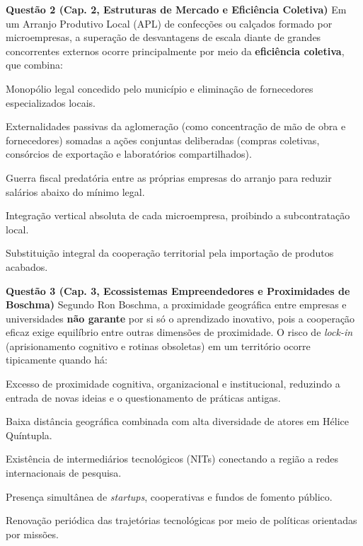 \textbf{Questão 2 (Cap. 2, Estruturas de Mercado e Eficiência Coletiva)}
Em um Arranjo Produtivo Local (APL) de confecções ou calçados formado por microempresas, a superação de desvantagens de escala diante de grandes concorrentes externos ocorre principalmente por meio da \textbf{eficiência coletiva}, que combina:
\begin{alternativas}
  \item Monopólio legal concedido pelo município e eliminação de fornecedores especializados locais.
  \item Externalidades passivas da aglomeração (como concentração de mão de obra e fornecedores) somadas a ações conjuntas deliberadas (compras coletivas, consórcios de exportação e laboratórios compartilhados).
  \item Guerra fiscal predatória entre as próprias empresas do arranjo para reduzir salários abaixo do mínimo legal.
  \item Integração vertical absoluta de cada microempresa, proibindo a subcontratação local.
  \item Substituição integral da cooperação territorial pela importação de produtos acabados.
\end{alternativas}

\textbf{Questão 3 (Cap. 3, Ecossistemas Empreendedores e Proximidades de Boschma)}
Segundo Ron Boschma, a proximidade geográfica entre empresas e universidades \textbf{não garante} por si só o aprendizado inovativo, pois a cooperação eficaz exige equilíbrio entre outras dimensões de proximidade. O risco de \textit{lock-in} (aprisionamento cognitivo e rotinas obsoletas) em um território ocorre tipicamente quando há:
\begin{alternativas}
  \item Excesso de proximidade cognitiva, organizacional e institucional, reduzindo a entrada de novas ideias e o questionamento de práticas antigas.
  \item Baixa distância geográfica combinada com alta diversidade de atores em Hélice Quíntupla.
  \item Existência de intermediários tecnológicos (NITs) conectando a região a redes internacionais de pesquisa.
  \item Presença simultânea de \textit{startups}, cooperativas e fundos de fomento público.
  \item Renovação periódica das trajetórias tecnológicas por meio de políticas orientadas por missões.
\end{alternativas}

